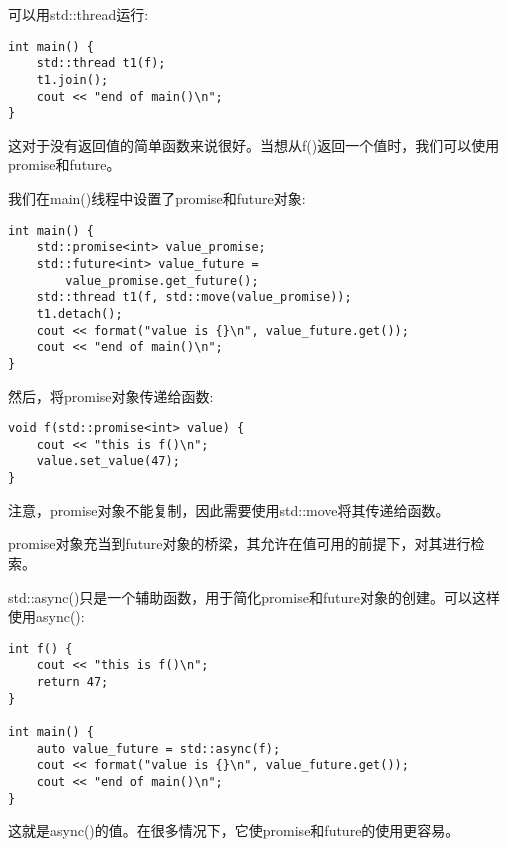 可以用std::thread运行:

\begin{lstlisting}[style=styleCXX]
int main() {
	std::thread t1(f);
	t1.join();
	cout << "end of main()\n";
}
\end{lstlisting}

这对于没有返回值的简单函数来说很好。当想从f()返回一个值时，我们可以使用promise和future。

我们在main()线程中设置了promise和future对象:

\begin{lstlisting}[style=styleCXX]
int main() {
	std::promise<int> value_promise;
	std::future<int> value_future =
		value_promise.get_future();
	std::thread t1(f, std::move(value_promise));
	t1.detach();
	cout << format("value is {}\n", value_future.get());
	cout << "end of main()\n";
}
\end{lstlisting}

然后，将promise对象传递给函数:

\begin{lstlisting}[style=styleCXX]
void f(std::promise<int> value) {
	cout << "this is f()\n";
	value.set_value(47);
}
\end{lstlisting}

注意，promise对象不能复制，因此需要使用std::move将其传递给函数。

promise对象充当到future对象的桥梁，其允许在值可用的前提下，对其进行检索。

std::async()只是一个辅助函数，用于简化promise和future对象的创建。可以这样使用async():

\begin{lstlisting}[style=styleCXX]
int f() {
	cout << "this is f()\n";
	return 47;
}

int main() {
	auto value_future = std::async(f);
	cout << format("value is {}\n", value_future.get());
	cout << "end of main()\n";
}
\end{lstlisting}

这就是async()的值。在很多情况下，它使promise和future的使用更容易。

















